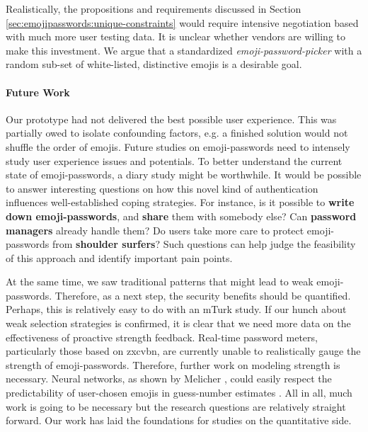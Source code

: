 Realistically, the propositions and requirements discussed in Section \ref{sec:emojipasswords:unique-constraints} would require intensive negotiation based with much more user testing data.  It is unclear whether vendors are willing to make this investment. We argue that a standardized \textit{emoji-password-picker} with a random sub-set of white-listed, distinctive emojis is a desirable goal. 

\paragraph{Future Work}
Our prototype had not delivered the best possible user experience. This was partially owed to isolate confounding factors, e.g. a finished solution would not shuffle the order of emojis. Future studies on emoji-passwords need to intensely study user experience issues and potentials. To better understand the current state of emoji-passwords, a diary study might be worthwhile. It would be possible to answer interesting questions on how this novel kind of authentication influences well-established coping strategies. For instance, is it possible to \textbf{write down emoji-passwords}, and \textbf{share} them with somebody else? Can \textbf{password managers} already handle them?  Do users take more care to protect emoji-passwords from \textbf{shoulder surfers}? Such questions can help judge the feasibility of this approach and identify important pain points.

At the same time, we saw traditional patterns that might lead to weak emoji-passwords. Therefore, as a next step, the security benefits should be quantified. Perhaps, this is relatively easy to do with an \gls{mTurk} study. If our hunch about weak selection strategies is confirmed, it is clear that we need more data on the effectiveness of proactive strength feedback. Real-time password meters, particularly those based on zxcvbn, are currently unable to realistically gauge the strength of emoji-passwords. Therefore, further work on modeling strength is necessary. Neural networks, as shown by Melicher \etal, could easily respect the predictability of user-chosen emojis in guess-number estimates \cite{Melicher2016NeuralNetworks}. All in all, much work is going to be necessary but the research questions are relatively straight forward. Our work has laid the foundations for studies on the quantitative side. 

\vspace*{1cm}\noindent
{}
